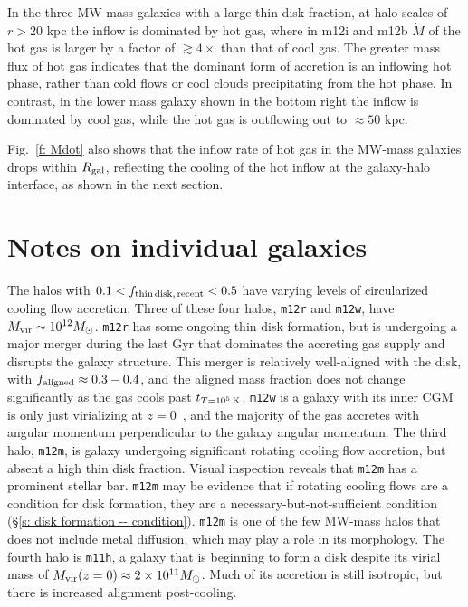 \documentclass[fleqn,usenatbib]{mnras}
\newcommand{\tcon}{t_{T=10^5\,{\rm K}}}
\newcommand{\Mdot}{\dot{M}}
\begin{document}
In the three MW mass galaxies with a large thin disk fraction, at halo scales of $r>20$ kpc the inflow is dominated by hot gas, where in m12i and m12b $\Mdot$ of the hot gas is larger by a factor of $\gtrsim 4\times$ than that of cool gas. The greater mass flux of hot gas indicates that the dominant form of accretion is an inflowing hot phase, rather than cold flows or cool clouds precipitating from the hot phase.
In contrast, in the lower mass galaxy shown in the bottom right the inflow is dominated by cool gas, while the hot gas is outflowing out to $\approx50$ kpc.

Fig.~\ref{f: Mdot} also shows that the inflow rate of hot gas in the MW-mass galaxies drops within $R_{\rm gal}$, reflecting the cooling of the hot inflow at the galaxy-halo interface, as shown in the next section.


\section{Notes on individual galaxies}

\label{s: appendix-individual}

The halos with $0.1 < f_{\rm thin\,disk,\,recent} < 0.5$ have varying levels of circularized cooling flow accretion.
Three of these four halos, \texttt{m12r} and \texttt{m12w}, have $M_{\rm vir} \sim 10^{12} M_\odot$.
\texttt{m12r} has some ongoing thin disk formation, but is undergoing a major merger during the last Gyr that dominates the accreting gas supply and disrupts the galaxy structure.
This merger is relatively well-aligned with the disk, with $f_{\rm aligned} \approx 0.3-0.4$, and the aligned mass fraction does not change significantly as the gas cools past $\tcon$.
\texttt{m12w} is a galaxy with its inner CGM is only just virializing at $z=0$~\citep{Yu2021}, and the majority of the gas accretes with angular momentum perpendicular to the galaxy angular momentum.
The third halo, \texttt{m12m}, is galaxy undergoing significant rotating cooling flow accretion, but absent a high thin disk fraction.
Visual inspection reveals that \texttt{m12m} has a prominent stellar bar.
\texttt{m12m} may be evidence that if rotating cooling flows are a condition for disk formation, they are a necessary-but-not-sufficient condition (\S\ref{s: disk formation -- condition}).
\texttt{m12m} is one of the few MW-mass halos that does not include metal diffusion, which may play a role in its morphology.
The fourth halo is \texttt{m11h}, a galaxy that is beginning to form a disk despite its virial mass of $M_{\rm vir}(z=0) \approx 2 \times 10^{11} M_\odot$.
Much of its accretion is still isotropic, but there is increased alignment post-cooling.
\end{document}
